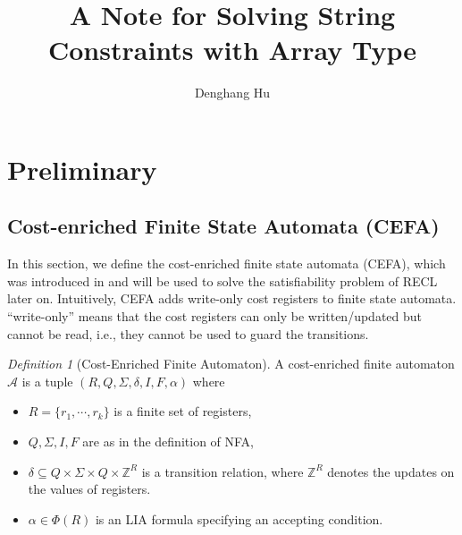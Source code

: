 \documentclass[12pt]{article}
\title{A Note for Solving String Constraints with Array Type}
\author{Denghang Hu}
\newcommand*{\aut}{\mathcal{A}}
\newcommand*{\Int}{\mathbb{Z}}
\newcommand*{\myvec}[1]{\vec{#1}}
\theoremstyle{remark}
\newtheorem{definition}{Definition}[section]
\begin{document}
\maketitle

\section{Preliminary}
\subsection{Cost-enriched Finite State Automata (CEFA)}
In this section, we define the cost-enriched finite state automata (CEFA), which was introduced in \cite{atva2020} and will be used to solve the satisfiability problem of RECL later on. 
%
Intuitively, CEFA adds write-only cost registers to finite state automata. ``write-only'' means that the cost registers can only be written/updated but cannot be read, i.e., they cannot be used to guard the transitions. 

%
\vspace{-0.5mm}
\begin{definition}[Cost-Enriched Finite Automaton]
    A cost-enriched finite automaton $\aut$ is a tuple $(R, Q, \Sigma, \delta, I, F, \alpha)$ where
    \begin{itemize}
        \item $R = \{r_1, \cdots, r_k\}$ is a finite set of registers,
        \item $Q, \Sigma, I, F$ are as in the definition of NFA,
        \item $\delta \subseteq Q \times \Sigma \times Q \times \Int^R$ is a transition relation, where $\Int^R$ denotes the updates on the values of registers.
        \item $\alpha \in \Phi(R)$ is an LIA formula specifying an accepting condition.
    \end{itemize}
\end{definition}
\vspace{-0.5mm}
\end{document}
